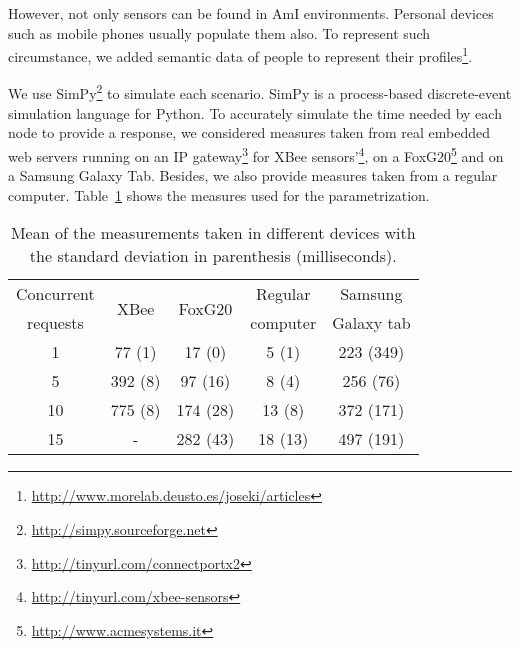 However, not only sensors can be found in AmI environments.
Personal devices such as mobile phones usually populate them also.
To represent such circumstance, we added semantic data of people to represent their profiles\footnote{\url{http://www.morelab.deusto.es/joseki/articles}}.

We use SimPy\footnote{\url{http://simpy.sourceforge.net}} to simulate each scenario.
SimPy is a process-based discrete-event simulation language for Python.
To accurately simulate the time needed by each node to provide a response, we considered measures taken from real embedded web servers running on an IP gateway\footnote{\url{http://tinyurl.com/connectportx2}} for XBee sensors'\footnote{\url{http://tinyurl.com/xbee-sensors}}, on a
FoxG20\footnote{\url{http://www.acmesystems.it}} and on a Samsung Galaxy Tab.
Besides, we also provide measures taken from a regular computer.
Table~\ref{tab:measures_embedded} shows the measures used for the parametrization.

\begin{table}
  \caption{Mean of the measurements taken in different devices with the standard deviation in parenthesis (milliseconds).}
  \label{tab:measures_embedded}
  \begin{center}
	\begin{tabular}{|c|c|c|c|c|}
	  \hline
	  Concurrent & \multirow{2}{*}{XBee} & \multirow{2}{*}{FoxG20} & Regular  & Samsung \\
	  requests   &  ~    &   ~     & computer & Galaxy tab \\
	  \hline
	  1  &  77 (1)	&  17 (0)  &   5 (1)  &  223 (349) \\
	  5  & 392 (8)	&  97 (16) &   8 (4)  &  256 (76)  \\
	  10 & 775 (8)	& 174 (28) &  13 (8)  &  372 (171) \\
	  15 &  -   	& 282 (43) &  18 (13) &  497 (191) \\
	  \hline
	\end{tabular}
  \end{center}
\end{table}

